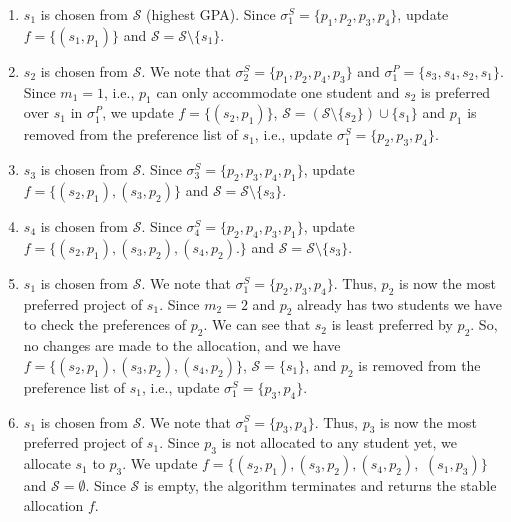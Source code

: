 \documentclass{article}
\begin{document}
\begin{enumerate}

\item $s_1$ is chosen from $\mathcal{S}$ (highest GPA). Since $\sigma^S_1 = \{p_1, p_2, p_3, p_4\}$, update $f=\{(s_1, p_1)\}$ and $\mathcal{S} = \mathcal{S}\setminus \{s_1\}$.

\item $s_2$ is chosen from $\mathcal{S}$. We note that $\sigma^S_2 = \{p_1, p_2, p_4, p_3\}$ and $\sigma^P_1 = \{s_3, s_4, s_2, s_1\}$. Since $m_1 = 1$, i.e., $p_1$ can only accommodate one student and $s_2$ is preferred over $s_1$ in $\sigma^P_1$, we update $f=\{(s_2, p_1)\}$, $\mathcal{S} = (\mathcal{S} \setminus \{s_2\}) \cup \{s_1\}$ and $p_1$ is removed from the preference list of $s_1$, i.e., update $\sigma^S_1 = \{p_2, p_3, p_4\}$.

\item $s_3$ is chosen from $\mathcal{S}$. Since $\sigma^S_3 = \{p_2, p_3, p_4, p_1\}$, update $f=\{(s_2, p_1), (s_3, p_2)\}$ and $\mathcal{S} = \mathcal{S}\setminus \{s_3\}$.

\item $s_4$ is chosen from $\mathcal{S}$. Since $\sigma^S_4 = \{p_2, p_4, p_3, p_1\}$, update $f=\{(s_2, p_1), (s_3, p_2), (s_4, p_2).\}$ and $\mathcal{S} = \mathcal{S}\setminus \{s_3\}$.

\item $s_1$ is chosen from $\mathcal{S}$. We note that $\sigma^S_1 = \{p_2, p_3, p_4\}$. Thus, $p_2$ is now the most preferred project of $s_1$. Since $m_2 = 2$ and $p_2$ already has two students we have to check the preferences of $p_2$. We can see that $s_2$ is least preferred by $p_2$. So, no changes are made to the allocation, and we have $f=\{(s_2, p_1), (s_3, p_2), (s_4, p_2)\}$, $\mathcal{S} = \{s_1\}$, and $p_2$ is removed from the preference list of $s_1$, i.e., update $\sigma^S_1 = \{p_3, p_4\}$.

\item $s_1$ is chosen from $\mathcal{S}$. We note that $\sigma^S_1 = \{p_3, p_4\}$. Thus, $p_3$ is now the most preferred project of $s_1$. Since $p_3$ is not allocated to any student yet, we allocate $s_1$ to $p_3$. We update $f=\{(s_2, p_1), (s_3, p_2), (s_4, p_2),$ $(s_1, p_3)\}$ and $\mathcal{S}= \emptyset$.  Since $\mathcal{S}$ is empty, the algorithm terminates and returns the stable allocation $f$.

\end{enumerate}
\end{document}
